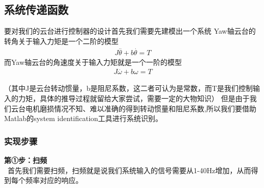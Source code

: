 \documentclass[UTF8,a4paper,12pt]{ctexart}
\begin{document}
  \subsection{系统传递函数}
    要对我们的云台进行控制器的设计首先我们需要先建模出一个系统
    Yaw轴云台的转角关于输入力矩是一个二阶的模型
    \begin{align*}
       J\overset{..}{\theta}+b\overset{.}{\theta}=T
    \end{align*}
    而Yaw轴云台的角速度关于输入力矩就是一个一阶的模型
    \begin{align*}
      J\overset{.}{\omega}+b\omega =T
    \end{align*}
    \begin{flushleft}
      （其中J是云台转动惯量，b是阻尼系数，这二者可认为是常数，而T是我们控制输入的力矩，具体的推导过程就留给大家尝试，需要一定的大物知识）
    但是由于我们云台电机磨损情况不知、难以准确的得到转动惯量和阻尼系数,所以我们要借助Matlab的system identification工具进行系统识别。\\
   \subsubsection{实现步骤}
      \begin{flushleft}
        \textbf{第①步：扫频}\\
        \ 首先我们需要扫频，扫频就是说我们系统输入的信号需要从1-40Hz增加，从而得到每个频率对应的响应。
      \end{flushleft}


\end{flushleft}
\end{document}
